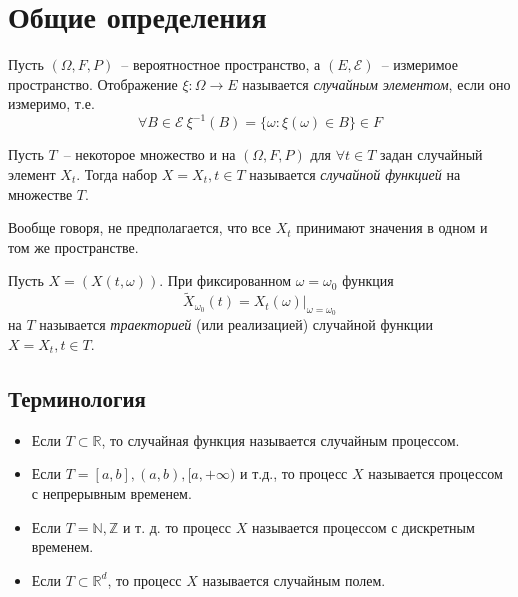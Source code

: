 

\ifdefined\Main\else

\fi

\section*{Общие определения}
\begin{definition}
Пусть $(\Omega, F, P)$~-- вероятностное пространство, а $(E, \mathcal{E})$~-- измеримое пространство.
Отображение $\xi: \Omega \rightarrow E$ называется \emph{случайным элементом}, если оно измеримо,
т.е. $$\forall B \in \mathcal{E}\ \xi^{-1}(B) = \{\omega: \xi(\omega) \in B\} \in F$$
\end{definition}
\begin{definition}
Пусть $T$~-- некоторое множество и на $(\Omega, F,P)$ для $\forall t\in T$ задан случайный элемент $X_t$. Тогда набор $X = {X_t, t \in T}$ называется \emph{случайной функцией} на множестве $T$. 
\end{definition}

\begin{remark}
Вообще говоря, не предполагается, что все $X_t$ принимают значения в одном и том же пространстве.
\end{remark}

\begin{definition}
Пусть $X = (X(t, \omega))$. При фиксированном $\omega = \omega_0$ функция
$$\tilde{X}_{\omega_0}(t) = X_t(\omega) \vert _{\omega=\omega_0}$$
на $T$ называется \emph{траекторией} (или реализацией) случайной функции $X = {X_t, t\in T}$. 
\end{definition}

\subsection{Терминология}
\begin{itemize}
\item Если $T \subset \mathbb{R}$, то случайная функция называется случайным процессом.
\item Если $T = [a, b], (a, b), [a, +\infty)$ и т.д., то процесс $X$ называется процессом с непрерывным временем.
\item Если $T = \mathbb{N}, \mathbb{Z}$ и т. д. то процесс $X$ называется процессом с дискретным временем.
\item Если $T \subset \mathbb{R}^d$, то процесс $X$ называется случайным полем.
\end{itemize}


